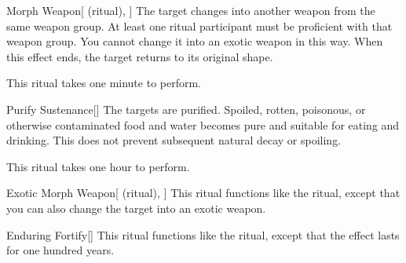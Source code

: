 \lowercase{\hypertarget{spell:Morph Weapon}{}}\label{spell:Morph Weapon}
\begin{attuneability}[Rank 1]{\hypertarget{spell:Morph Weapon}{Morph Weapon}}[ (ritual), ]
The target changes into another weapon from the same weapon group.
At least one ritual participant must be proficient with that weapon group.
You cannot change it into an exotic weapon in this way.
When this effect ends, the target returns to its original shape.

This ritual takes one minute to perform.
\end{attuneability}
\vspace{0.25em}



\lowercase{\hypertarget{spell:Purify Sustenance}{}}\label{spell:Purify Sustenance}
\begin{apability}[Rank 1]{\hypertarget{spell:Purify Sustenance}{Purify Sustenance}}[]
The targets are purified.
Spoiled, rotten, poisonous, or otherwise contaminated food and water becomes pure and suitable for eating and drinking.
This does not prevent subsequent natural decay or spoiling.

This ritual takes one hour to perform.
\end{apability}
\vspace{0.25em}



\lowercase{\hypertarget{spell:Exotic Morph Weapon}{}}\label{spell:Exotic Morph Weapon}
\begin{attuneability}[Rank 3]{\hypertarget{spell:Exotic Morph Weapon}{Exotic Morph Weapon}}[ (ritual), ]
This ritual functions like the  ritual, except that you can also change the target into an exotic weapon.
\end{attuneability}
\vspace{0.25em}



\lowercase{\hypertarget{spell:Enduring Fortify}{}}\label{spell:Enduring Fortify}
\begin{apability}[Rank 4]{\hypertarget{spell:Enduring Fortify}{Enduring Fortify}}[]
This ritual functions like the  ritual, except that the effect lasts for one hundred years.
\end{apability}
\vspace{0.25em}



